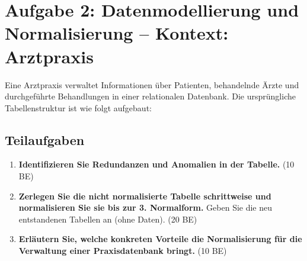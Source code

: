 \documentclass[a4paper,12pt]{article}
\begin{document}
	
\section*{Aufgabe 2: Datenmodellierung und Normalisierung – Kontext: Arztpraxis}

Eine Arztpraxis verwaltet Informationen über Patienten, behandelnde Ärzte und durchgeführte Behandlungen in einer relationalen Datenbank. Die ursprüngliche Tabellenstruktur ist wie folgt aufgebaut:

\begin{table}[h]
	\centering
	\caption{Ursprüngliche nicht normalisierte Tabelle}
\end{table}

\subsection*{Teilaufgaben}

\begin{enumerate}
	\item \textbf{Identifizieren Sie Redundanzen und Anomalien in der Tabelle.}  
	\hfill (10 BE)
	
	\item \textbf{Zerlegen Sie die nicht normalisierte Tabelle schrittweise und normalisieren Sie sie bis zur 3. Normalform.}  
	Geben Sie die neu entstandenen Tabellen an (ohne Daten).  
	\hfill (20 BE)
	
	\item \textbf{Erläutern Sie, welche konkreten Vorteile die Normalisierung für die Verwaltung einer Praxisdatenbank bringt.}  
	\hfill (10 BE)
\end{enumerate}
\end{document}
